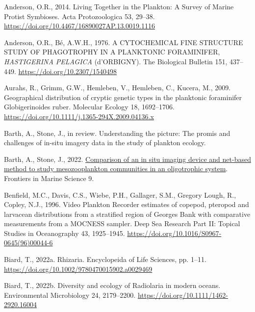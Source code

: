 \documentclass[
]{article}
\newlength{\cslhangindent}
\newlength{\cslentryspacingunit} %
\newenvironment{CSLReferences}[2] %
 {%
  \setlength{\parindent}{0pt}
  \ifodd #1
  \let\oldpar\par
  \def\par{\hangindent=\cslhangindent\oldpar}
  \fi
  \setlength{\parskip}{#2\cslentryspacingunit}
 }%
 {}
\begin{document}
\hypertarget{refs}{}
\begin{CSLReferences}{1}{0}
\leavevmode{}%
Anderson, O.R., 2014. Living Together in the Plankton: A Survey of
Marine Protist Symbioses. Acta Protozoologica 53, 29--38.
\url{https://doi.org/10.4467/16890027AP.13.0019.1116}

\leavevmode{}%
Anderson, O.R., Bé, A.W.H., 1976. A CYTOCHEMICAL FINE STRUCTURE STUDY OF
PHAGOTROPHY IN A PLANKTONIC FORAMINIFER, {\emph{HASTIGERINA PELAGICA}}
(d'ORBIGNY). The Biological Bulletin 151, 437--449.
\url{https://doi.org/10.2307/1540498}

\leavevmode{}%
Aurahs, R., Grimm, G.W., Hemleben, V., Hemleben, C., Kucera, M., 2009.
Geographical distribution of cryptic genetic types in the planktonic
foraminifer Globigerinoides ruber. Molecular Ecology 18, 1692--1706.
\url{https://doi.org/10.1111/j.1365-294X.2009.04136.x}

\leavevmode{}%
Barth, A., Stone, J., in review. Understanding the picture: The promis
and challenges of in-situ imagery data in the study of plankton ecology.

\leavevmode{}%
Barth, A., Stone, J., 2022.
\href{https://www.frontiersin.org/articles/10.3389/fmars.2022.898057}{Comparison
of an in situ imaging device and net-based method to study
mesozooplankton communities in an oligotrophic system}. Frontiers in
Marine Science 9.

\leavevmode{}%
Benfield, M.C., Davis, C.S., Wiebe, P.H., Gallager, S.M., Gregory Lough,
R., Copley, N.J., 1996. Video Plankton Recorder estimates of copepod,
pteropod and larvacean distributions from a stratified region of Georges
Bank with comparative measurements from a MOCNESS sampler. Deep Sea
Research Part II: Topical Studies in Oceanography 43, 1925--1945.
\url{https://doi.org/10.1016/S0967-0645(96)00044-6}

\leavevmode{}%
Biard, T., 2022a. Rhizaria. Encyclopeida of Life Sciences, pp. 1--11.
\url{https://doi.org/10.1002/9780470015902.a0029469}

\leavevmode{}%
Biard, T., 2022b. Diversity and ecology of Radiolaria in modern oceans.
Environmental Microbiology 24, 2179--2200.
\url{https://doi.org/10.1111/1462-2920.16004}


\end{CSLReferences}
\end{document}

